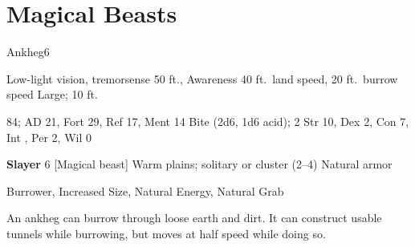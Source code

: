 \section{Magical Beasts}\label{Magical Beasts}

    \begin{monsection}{Ankheg}{6}
        \begin{spellcontent}
            \begin{spelltargetinginfo}
                \pari {} Low-light vision, tremorsense 50 ft., Awareness 
                \pari {} 40 ft.\ land speed, 20 ft.\ burrow speed
                \pari {} Large;  10 ft.
            \end{spelltargetinginfo}
            \begin{spelleffects}
                \pari {} 84;  AD 21, Fort 29, Ref 17, Ment 14
                \pari {} Bite  (2d6, 1d6 acid);  2
                \pari {} Str 10, Dex 2, Con 7, Int , Per 2, Wil 0
            \end{spelleffects}
        \end{spellcontent}
        \begin{spellfooter}
            \pari {} \textbf{Slayer} 6 [Magical beast]
            \pari {} Warm plains; solitary or cluster (2--4)
            \pari {} Natural armor 
        \end{spellfooter}
    \end{monsection}
     Burrower, Increased Size, Natural Energy, Natural Grab

     An ankheg can burrow through loose earth and dirt.
    It can construct usable tunnels while burrowing, but moves at half speed while doing so.

